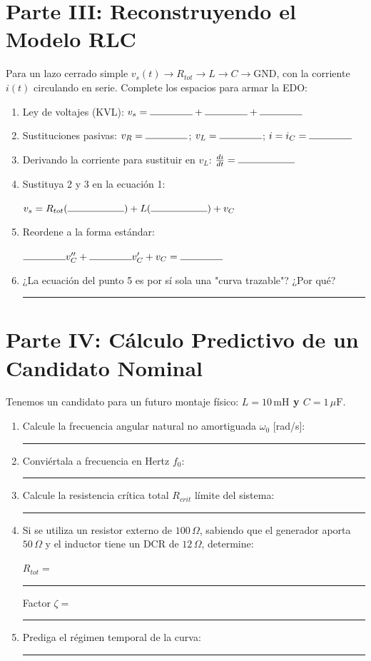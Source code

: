 \documentclass[11pt, a4paper]{article}
\begin{document}
\vspace{0.2cm}
\section*{Parte III: Reconstruyendo el Modelo RLC}
Para un lazo cerrado simple $v_s(t) \to R_{tot} \to L \to C \to \text{GND}$, con la corriente $i(t)$ circulando en serie. Complete los espacios para armar la EDO:

\begin{enumerate}\setlength\itemsep{0.4cm}
    \item Ley de voltajes (KVL): $v_s = \rule{1.5cm}{0.4pt} + \rule{1.5cm}{0.4pt} + \rule{1.5cm}{0.4pt}$
    \item Sustituciones pasivas: $v_R = \rule{1.5cm}{0.4pt}$; \quad $v_L = \rule{1.5cm}{0.4pt}$; \quad $i = i_C = \rule{1.5cm}{0.4pt}$
    \item Derivando la corriente para sustituir en $v_L$: $\frac{di}{dt} = \rule{2cm}{0.4pt}$
    \item Sustituya 2 y 3 en la ecuación 1: \par
    \vspace{0.1cm}
    $v_s = R_{tot} (\rule{2cm}{0.4pt}) + L (\rule{2cm}{0.4pt}) + v_C$
    \item Reordene a la forma estándar: \par
    \vspace{0.1cm}
    $\rule{1.5cm}{0.4pt} v_C'' + \rule{1.5cm}{0.4pt} v_C' + v_C = \rule{1.5cm}{0.4pt}$
    \item ¿La ecuación del punto 5 es por sí sola una "curva trazable"? ¿Por qué? \par
    \vspace{0.2cm}
    \noindent\rule{\textwidth}{0.4pt}
\end{enumerate}

\vspace{0.2cm}
\section*{Parte IV: Cálculo Predictivo de un Candidato Nominal}
Tenemos un candidato para un futuro montaje físico: \textbf{$L = 10\,\text{mH}$ y $C = 1\,\mu\text{F}$}. 
\begin{enumerate}\setlength\itemsep{0.3cm}
    \item Calcule la frecuencia angular natural no amortiguada $\omega_0$ [rad/s]: \rule{3cm}{0.4pt}
    \item Conviértala a frecuencia en Hertz $f_0$: \rule{3cm}{0.4pt}
    \item Calcule la resistencia crítica total $R_{crit}$ límite del sistema: \rule{3cm}{0.4pt}
    \item Si se utiliza un resistor externo de $100\,\Omega$, sabiendo que el generador aporta $50\,\Omega$ y el inductor tiene un DCR de $12\,\Omega$, determine: \par
    \vspace{0.1cm}
    $R_{tot} =$ \rule{2cm}{0.4pt} \hspace{1.5cm} Factor $\zeta =$ \rule{2cm}{0.4pt}
    \item Prediga el régimen temporal de la curva: \rule{6cm}{0.4pt}
\end{enumerate}
\end{document}
